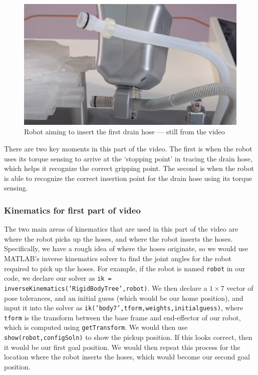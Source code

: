 \documentclass[conference]{IEEEtran}
\begin{document}
\begin{figure}[h!]
    \centering
    \includegraphics[scale=0.15]{kuka-drain-hose-insertion.png}
    \caption{Robot aiming to insert the first drain hose --- still from the video}
    \label{kuka-drain-hose-insertion}
\end{figure}

There are two key moments in this part of the video. The first is when the robot
uses its torque sensing to arrive at the `stopping point' in tracing the drain
hose, which helps it recognize the correct gripping point. The second is when
the robot is able to recognize the correct insertion point for the drain hose
using its torque sensing.

\subsubsection{Kinematics for first part of video}

The two main areas of kinematics that are used in this part of the video are
where the robot picks up the hoses, and where the robot inserts the hoses.
Specifically, we have a rough idea of where the hoses originate, so we would
use MATLAB's inverse kinematics solver to find the joint angles for the robot
required to pick up the hoses. For example, if the robot is named \texttt{robot} 
in our code, we declare our solver as \texttt{ik = inverseKinematics('RigidBodyTree',robot)}.
We then declare a $1 \times 7$ vector of pose tolerances, and an initial guess (which
would be our home position), and input it into the solver as \texttt{ik('body7',tform,weights,initialguess)},
where \texttt{tform} is the transform between the base frame and end-effector of our
robot, which is computed using \texttt{getTransform}. We would then use
\texttt{show(robot,configSoln)} to show the pickup position. If this looks correct,
then it would be our first goal position. We would then repeat this process for the
location where the robot inserts the hoses, which would become our second goal position.
\end{document}
